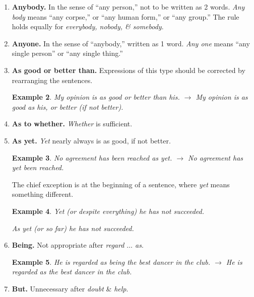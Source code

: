 \documentclass[oneside]{book}
\numberwithin{equation}{section}
\newtheorem{example}{Example}[chapter]
\begin{document}
\begin{enumerate}
	\begin{example}
		I anticipated that he would look older. $\to$ I expected that he would look older.
		
		My brother anticipated the upturn in the market. $\to$ My brother expected the upturn in the market.
	\end{example}
	In the 2nd example, the word \textit{anticipated} is ambiguous. It could mean simply that the brother believed the upturn would occur, or it could mean that he acted in advance of the expected upturn -- by buying stock, perhaps.
	\item \textbf{Anybody.} In the sense of ``any person,'' not to be written as 2 words. \textit{Any body} means ``any corpse,'' or ``any human form,'' or ``any group.'' The rule holds equally for \textit{everybody, nobody, \& somebody}.
	\item \textbf{Anyone.} In the sense of ``anybody,'' written as 1 word. \textit{Any one} means ``any single person'' or ``any single thing.''
	\item \textbf{As good or better than.} Expressions of this type should be corrected by rearranging the sentences.
	
	\begin{example}
		My opinion is as good or better than his. $\to$ My opinion is as good as his, or better (if not better).
	\end{example}
	\item \textbf{As to whether.} \textit{Whether} is sufficient.
	\item \textbf{As yet.} \textit{Yet} nearly always is as good, if not better.
	
	\begin{example}
		No agreement has been reached as yet. $\to$ No agreement has yet been reached.
	\end{example}
	The chief exception is at the beginning of a sentence, where \textit{yet} means something different.
	
	\begin{example}
		Yet (\emph{or} despite everything) he has not succeeded.
		
		As yet (\emph{or} so far) he has not succeeded.
	\end{example}
	\item \textbf{Being.} Not appropriate after \textit{regard $\ldots$ as}.
	
	\begin{example}
		He is regarded as being the best dancer in the club. $\to$ He is regarded as the best dancer in the club.
	\end{example}
	\item \textbf{But.} Unnecessary after \textit{doubt} \& \textit{help}.
	

\end{enumerate}
\end{document}
